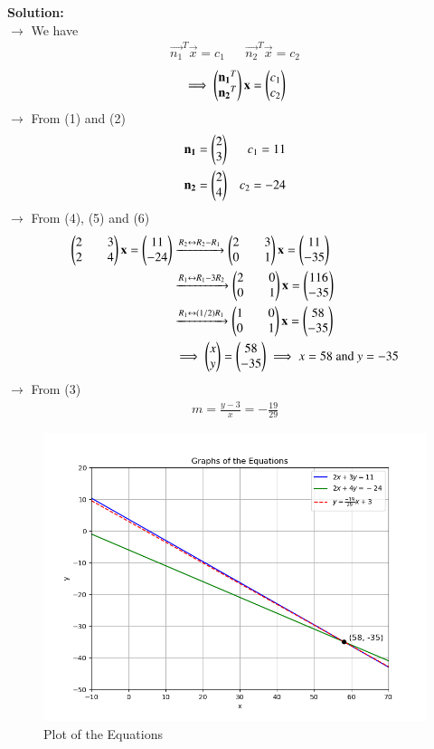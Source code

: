 \documentclass[journal]{IEEEtran}
\begin{document}
\textbf{Solution:}\\
$\rightarrow$ We have
\begin{align*} \vec{n_1}^T\vec{x} = c_1 && \vec{n_2}^T\vec{x} = c_2 \end{align*}
\begin{align} \implies \begin{pmatrix}\mathbf{n_1}^T\\\mathbf{n_2}^T\end{pmatrix}\mathbf{x} = \begin{pmatrix}c_1\\c_2\end{pmatrix} \end{align}
$\rightarrow$ From (1) and (2)
\begin{align}
    \mathbf{n_1} = \begin{pmatrix}2\\3\end{pmatrix} && c_1 = 11 \\
    \mathbf{n_2} = \begin{pmatrix}2\\4\end{pmatrix} && c_2 = -24
\end{align}
$\rightarrow$ From (4), (5) and (6)
\begin{align}
    \begin{pmatrix}2&&3\\2&&4\end{pmatrix}\mathbf{x} = \begin{pmatrix}11\\-24\end{pmatrix}
    &\xrightarrow{R_2 \leftrightarrow R_2 - R_1} \begin{pmatrix}2&&3\\0&&1\end{pmatrix}\mathbf{x} = \begin{pmatrix}11\\-35\end{pmatrix} \\
    &\xrightarrow{R_1 \leftrightarrow R_1 - 3R_2} \begin{pmatrix}2&&0\\0&&1\end{pmatrix}\mathbf{x} = \begin{pmatrix}116\\-35\end{pmatrix} \\
    &\xrightarrow{R_1 \leftrightarrow (1/2)R_1} \begin{pmatrix}1&&0\\0&&1\end{pmatrix}\mathbf{x} = \begin{pmatrix}58\\-35\end{pmatrix} \\
    &\implies \begin{pmatrix}x\\y\end{pmatrix} = \begin{pmatrix}58\\-35\end{pmatrix} \implies x = 58 \text{ and } y = -35
\end{align}
$\rightarrow$ From (3)
\begin{align}
    m = \frac{y - 3}{x} = -\frac{19}{29}
\end{align}
\begin{figure}[h!]
   \centering
   \includegraphics[width=\linewidth]{figs/01.png}
   \caption{Plot of the Equations}
   \label{Plot_1}
\end{figure}
\end{document}
